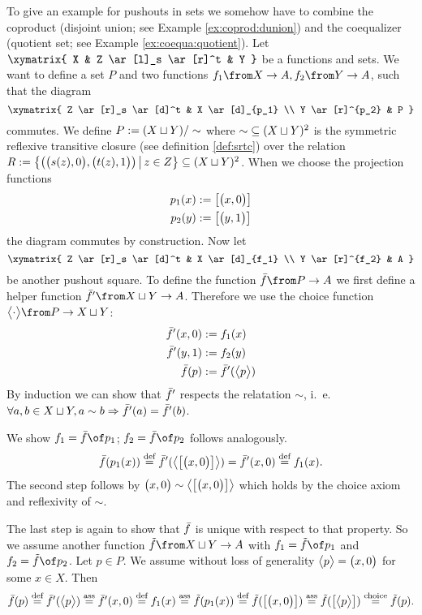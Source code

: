 \begin{example}
  \label{ex:pushout:set}
  To give an example for pushouts in sets we somehow have to combine the coproduct (disjoint union; see Example \ref{ex:coprod:dunion}) and the coequalizer (quotient set; see Example \ref{ex:coequa:quotient}).
  Let
  $ \xymatrix{
    X & Z \ar[l]_s \ar[r]^t & Y
  } $
  be a functions and sets.
  We want to define a set $P$ and two functions $f_1 \from X \to A, f_2 \from Y \to A$, such that the diagram
  \[ \xymatrix{
    Z \ar[r]_s \ar[d]^t & X \ar[d]_{p_1} \\
    Y \ar[r]^{p_2} & P
  } \]
  commutes.
  We define $P := (X \sqcup Y) / \sim$ where $\sim \; \subseteq (X \sqcup Y)^2$ is the symmetric reflexive transitive closure (see definition \ref{def:srtc}) over the relation
  $R := \bigl \{ \bigl( \bigl( s(z) , 0 \bigr) , \bigl( t(z) , 1 \bigr) \bigr) \,\big|\, z \in Z \bigr \} \subseteq (X \sqcup Y)^2$.
  When we choose the projection functions
  \begin{alignat*}{2}
    p_1(x) &:= \bigl[ \bigl( x , 0 \bigr) \bigr] \\
    p_2(y) &:= \bigl[ \bigl( y , 1 \bigr) \bigr]
  \end{alignat*}
  the diagram commutes by construction. Now let
  \[ \xymatrix{
    Z \ar[r]_s \ar[d]^t & X \ar[d]_{f_1} \\
    Y \ar[r]^{f_2} & A
  } \]
  be another pushout square. To define the function $\fbar \from P \to A$ we first define a helper function $\fbar' \from X \dunion Y \to A$.
  Therefore we use the choice function
  $\choice \cdot \from P \to X \dunion Y$:
  \begin{alignat*}{2}
    \bar{f}'(x, 0) &:= f_1(x) \\
    \bar{f}'(y, 1) &:= f_2(y) \\
    \bar{f}(p)     &:= \bar{f}'(\bigl< p \bigr>)
  \end{alignat*}
  By induction we can show that $\bar{f}'$ respects the relatation $\sim$, i.~e. $\forall a,b \in X \sqcup Y, a \sim b \Rightarrow \bar{f}'(a) = \bar{f}'(b)$.

  We show $f_1 = \fbar \of p_1$; $f_2 = \fbar \of p_2$ follows analogously.
  $$\bar{f}(p_1(x)) \stackrel{\text{def}}{=} \bar{f}'(\bigl< \bigl[ \bigl( x , 0 \bigr) \bigr] \bigr>) = \bar{f}'(x, 0) \stackrel{\text{def}}{=} f_1(x).$$
  The second step follows by $\bigl( x , 0 \bigr) \sim \bigl< \bigl[ \bigl( x , 0 \bigr) \bigr] \bigr>$ which holds by the choice axiom and reflexivity of $\sim$.

  The last step is again to show that $\bar{f}$ is unique with respect to that property. So we assume another function $\ftilde \from X \dunion Y \to A$ with $f_1 = \ftilde \of p_1$ and $f_2 = \ftilde \of p_2$.
  Let $p \in P$. We assume without loss of generality $\bigl< p \bigr> = \bigl( x , 0 \bigr)$ for some $x \in X$. Then
  $$\bar{f}(p)
    \stackrel{\text{def}}{=} \bar{f}'(\bigl< p \bigr>)
    \stackrel{\text{ass}}{=} \bar{f}'(x, 0)
    \stackrel{\text{def}}{=} f_1(x)
    \stackrel{\text{ass}}{=} \tilde{f}(p_1(x)) \stackrel{\text{def}}{=} \tilde{f}(\bigl[ \bigl( x , 0 \bigr) \bigr])
    \stackrel{\text{ass}}{=} \tilde{f}(\bigl[ \bigl< p \bigr> \bigr])
    \stackrel{\text{choice}}{=} \tilde{f}(p).$$
\end{example}


